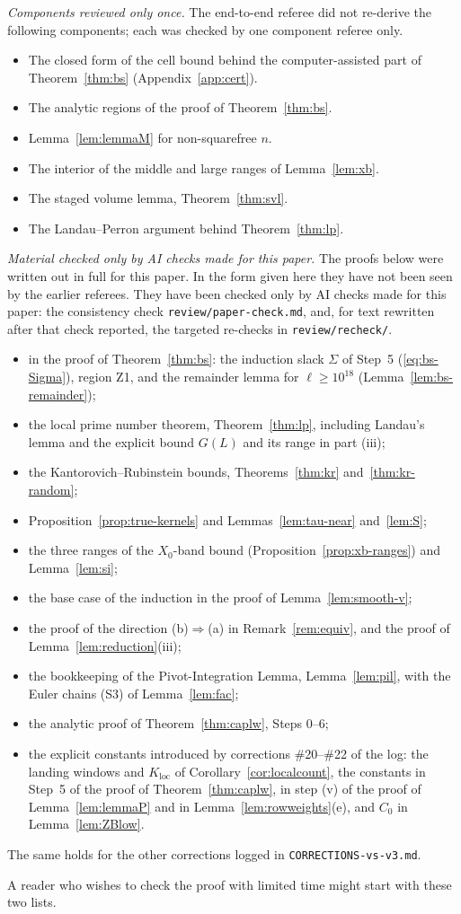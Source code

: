 \emph{Components reviewed only once.} The end-to-end referee did not re-derive the following components; each was checked by one
component referee only.
\begin{itemize}
\item The closed form of the cell bound behind the computer-assisted part of Theorem~\ref{thm:bs} (Appendix~\ref{app:cert}).
\item The analytic regions of the proof of Theorem~\ref{thm:bs}.
\item Lemma~\ref{lem:lemmaM} for non-squarefree $n$.
\item The interior of the middle and large ranges of Lemma~\ref{lem:xb}.
\item The staged volume lemma, Theorem~\ref{thm:svl}.
\item The Landau--Perron argument behind Theorem~\ref{thm:lp}.
\end{itemize}
\emph{Material checked only by AI checks made for this paper.} The proofs below were written out in full for this paper. In the
form given here they have not been seen by the earlier referees. They have been checked only by AI checks made for this paper: the
consistency check \texttt{review/paper-check.md}, and, for text rewritten after that check reported, the targeted re-checks in
\texttt{review/recheck/}.
\begin{itemize}
\item in the proof of Theorem~\ref{thm:bs}: the induction slack $\Sigma$ of Step~5 (\eqref{eq:bs-Sigma}), region Z1, and the
remainder lemma for $\ell\ge10^{18}$ (Lemma~\ref{lem:bs-remainder});
\item the local prime number theorem, Theorem~\ref{thm:lp}, including Landau's lemma and the explicit bound $G(L)$ and its range in
part (iii);
\item the Kantorovich--Rubinstein bounds, Theorems~\ref{thm:kr} and~\ref{thm:kr-random};
\item Proposition~\ref{prop:true-kernels} and Lemmas~\ref{lem:tau-near} and~\ref{lem:S};
\item the three ranges of the $X_0$-band bound (Proposition~\ref{prop:xb-ranges}) and Lemma~\ref{lem:si};
\item the base case of the induction in the proof of Lemma~\ref{lem:smooth-v};
\item the proof of the direction (b)$\Rightarrow$(a) in Remark~\ref{rem:equiv}, and the proof of Lemma~\ref{lem:reduction}(iii);
\item the bookkeeping of the Pivot-Integration Lemma, Lemma~\ref{lem:pil}, with the Euler chains (S3) of Lemma~\ref{lem:fac};
\item the analytic proof of Theorem~\ref{thm:caplw}, Steps 0--6;
\item the explicit constants introduced by corrections \#20--\#22 of the log: the landing windows and $K_{\mathrm{loc}}$ of
Corollary~\ref{cor:localcount}, the constants in Step~5 of the proof of Theorem~\ref{thm:caplw}, in step (v) of the proof of
Lemma~\ref{lem:lemmaP} and in Lemma~\ref{lem:rowweights}(e), and $C_0$ in Lemma~\ref{lem:ZBlow}.
\end{itemize}
The same holds for the other corrections logged in \texttt{CORRECTIONS-vs-v3.md}.

A reader who wishes to check the proof with limited time might start with these two lists.
